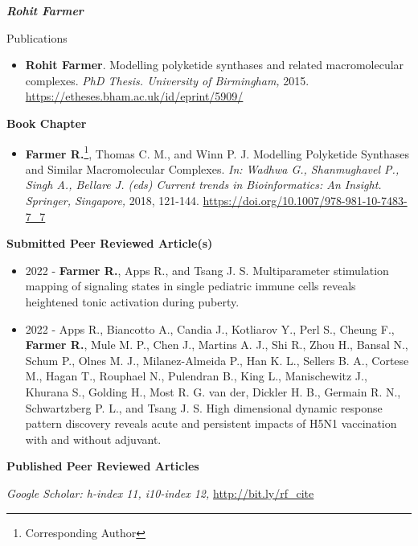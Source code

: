 \documentclass[10pt]{article}
\begin{document}
\begin{cv}{\huge \it \bfseries Rohit Farmer}
\newpage
\vskip3pt
\begin{cvlist}{Publications}
\item {\begin{itemize}\item{\bf Rohit Farmer}. Modelling polyketide synthases and related macromolecular complexes. \emph{PhD Thesis. University of Birmingham,} 2015. \url{https://etheses.bham.ac.uk/id/eprint/5909/} \end{itemize}}

\vskip3pt
\item {\textbf{Book Chapter}}
\item {\begin{itemize}\item{\bf Farmer R.}\footnote{Corresponding Author}, Thomas C. M., and Winn P. J. Modelling Polyketide Synthases and Similar Macromolecular Complexes. \emph{In: Wadhwa G., Shanmughavel P., Singh A., Bellare J. (eds) Current trends in Bioinformatics: An Insight. Springer, Singapore,} 2018, 121-144. \url{https://doi.org/10.1007/978-981-10-7483-7_7} \end{itemize}}

\vskip3pt
\item {\textbf{Submitted Peer Reviewed Article(s)}}
\item {\begin{itemize}
	\item  2022 - \textbf{Farmer R.}, Apps R., and Tsang J. S. Multiparameter stimulation mapping of signaling states in single pediatric immune cells reveals heightened tonic activation during puberty.

	\item  2022 -  Apps R., Biancotto A., Candia J., Kotliarov Y., Perl S., Cheung F., \textbf{Farmer R.}, Mule M. P., Chen J., Martins A. J., Shi R., Zhou H., Bansal N., Schum P., Olnes M. J., Milanez-Almeida P., Han K. L., Sellers B. A., Cortese M., Hagan T., Rouphael N., Pulendran B., King L., Manischewitz J., Khurana S., Golding H., Most R. G. van der, Dickler H. B., Germain R. N., Schwartzberg P. L., and Tsang J. S. High dimensional dynamic response pattern discovery reveals acute and persistent impacts of H5N1 vaccination with and without adjuvant. 
\end{itemize}}

\vskip3pt
\item {\bf Published Peer Reviewed Articles}
\item {\textit{Google Scholar: h-index 11, i10-index 12,} \url{http://bit.ly/rf_cite}}
\vskip3pt
\item{ }


\end{cvlist}
\end{cv}
\end{document}

